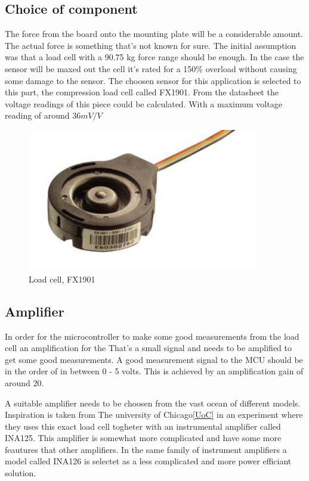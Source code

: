 \subsection{Choice of component}

The force from the board onto the mounting plate will be a considerable amount. The actual force is something that’s not known for sure. The initial assumption was that a load cell with a 90.75 kg force range should be enough. In the case the sensor will be maxed out the cell it's rated for a 150\% overload without causing some damage to the sensor.
The choosen sensor for this application is selected to this part, the compression load cell called FX1901. 
From the datasheet the voltage readings of this piece could be calculated. With a maximum voltage reading of around $36mV/V$

 \begin{figure}[H]
\begin{center}
	\includegraphics[width = 10cm]{Figures/Load_cell.png}
	\caption{Load cell, FX1901}
	\label{Load_cell}
\end{center}
\end{figure}



\subsection{Amplifier}


In order for the microcontroller to make some good measurements from the load cell an amplification for the  
That’s a small signal and needs to be amplified to get some good measurements. A good measurement signal to the MCU should be in the order of in between 0 - 5 volts. 
This is achieved by an amplification gain of around 20. 


A suitable amplifier needs to be choosen from the vast ocean of different models. Inspiration is taken from The university of Chicago\ref{UoC} in an experiment where they uses this exact load cell togheter with an instrumental amplifier called INA125. This amplifier is somewhat more complicated and have some more feautures that other amplifiers. In the same family of instrument amplifiers a model called INA126 is selectet as a less complicated and more power efficiant solution.


